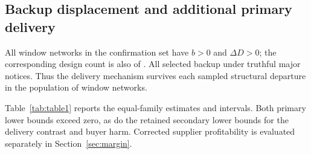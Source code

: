 \documentclass[preprint,11pt,authoryear]{elsarticle}
\begin{document}
\subsection{Backup displacement and additional primary delivery}
All  window networks in the confirmation set have $b>0$ and $\Delta D>0$; the corresponding design count is also  of . All selected backup under truthful major notices. Thus the delivery mechanism survives each sampled structural departure in the population of window networks.

Table~\ref{tab:table1} reports the equal-family estimates and intervals. Both primary lower bounds exceed zero, as do the retained secondary lower bounds for the delivery contrast and buyer harm. Corrected supplier profitability is evaluated separately in Section~\ref{sec:margin}.
\end{document}
